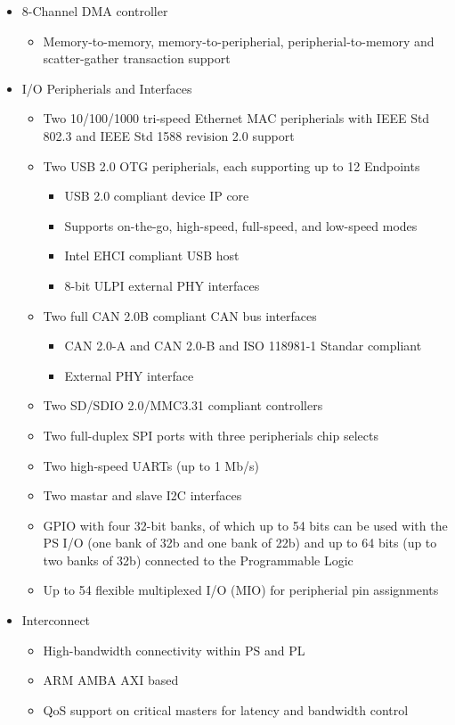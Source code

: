 \begin{itemize}
\begin{itemize}
\begin{itemize}
		\end{itemize}
	\end{itemize}
	\item 8-Channel DMA controller
	\begin{itemize}
		\item Memory-to-memory, memory-to-peripherial, peripherial-to-memory and scatter-gather transaction support
	\end{itemize}
	\item I/O Peripherials and Interfaces
	\begin{itemize}
		\item Two 10/100/1000 tri-speed Ethernet MAC peripherials with IEEE Std 802.3 and IEEE Std 1588 revision 2.0 support
		\item Two USB 2.0 OTG peripherials, each supporting up to 12 Endpoints
		\begin{itemize}
			\item USB 2.0 compliant device IP core
			\item Supports on-the-go, high-speed, full-speed, and low-speed modes
			\item Intel EHCI compliant USB host
			\item 8-bit ULPI external PHY interfaces
		\end{itemize}
		\item Two full CAN 2.0B compliant CAN bus interfaces
		\begin{itemize}
			\item CAN 2.0-A and CAN 2.0-B and ISO 118981-1 Standar compliant
			\item External PHY interface
		\end{itemize}
		\item Two SD/SDIO 2.0/MMC3.31 compliant controllers
		\item Two full-duplex SPI ports with three peripherials chip selects
		\item Two high-speed UARTs (up to 1 Mb/s)
		\item Two mastar and slave I2C interfaces
		\item GPIO with four 32-bit banks, of which up to 54 bits can be used with the PS I/O (one bank of 32b and one bank of 22b) and up to 64 bits (up to two banks of 32b) connected to the Programmable Logic
		\item Up to 54 flexible multiplexed I/O (MIO) for peripherial pin assignments
	\end{itemize}
	\item Interconnect
	\begin{itemize}
		\item High-bandwidth connectivity within PS and PL
		\item ARM AMBA AXI based
		\item QoS support on critical masters for latency and bandwidth control
	\end{itemize}
\end{itemize}

